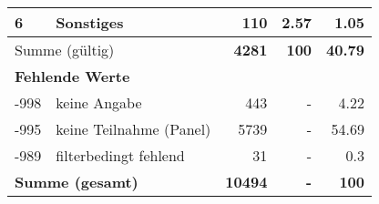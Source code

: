 \begin{longtable}{lXrrr}
     6 &
     \multicolumn{1}{X}{ Sonstiges   } &


       \num{110} &
       \num[round-mode=places,round-precision=2]{2,57} &
         \num[round-mode=places,round-precision=2]{1,05} \\
     \midrule
     \multicolumn{2}{l}{Summe (gültig)} &
       \textbf{\num{4281}} &
     \textbf{100} &
       \textbf{\num[round-mode=places,round-precision=2]{40,79}} \\
     \multicolumn{5}{l}{\textbf{Fehlende Werte}}\\
       -998 &
       keine Angabe &
         \num{443} &
        - &
         \num[round-mode=places,round-precision=2]{4,22} \\
       -995 &
       keine Teilnahme (Panel) &
         \num{5739} &
        - &
         \num[round-mode=places,round-precision=2]{54,69} \\
       -989 &
       filterbedingt fehlend &
         \num{31} &
        - &
         \num[round-mode=places,round-precision=2]{0,3} \\
     \midrule
     \multicolumn{2}{l}{\textbf{Summe (gesamt)}} &
          \textbf{\num{10494}} &
        \textbf{-} &
        \textbf{100} \\
     \bottomrule
     \end{longtable}
     
